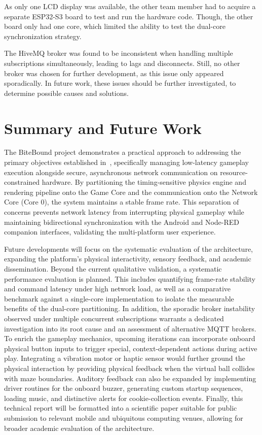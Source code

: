 \documentclass[10pt,journal,final,a4paper]{IEEEtran}
\begin{document}
As only one LCD display was available, the other team member had to acquire a separate ESP32-S3 board to test and run the hardware code. Though, the other board only had one core, which limited the ability to test the dual-core synchronization strategy.

The HiveMQ broker was found to be inconsistent when handling multiple subscriptions simultaneously, leading to lags and disconnects. Still, no other broker was chosen for further development, as this issue only appeared sporadically. In future work, these issues should be further investigated, to determine possible causes and solutions.

\section{Summary and Future Work}
\label{sec:summary-future-work}

The BiteBound project demonstrates a practical approach to addressing the primary objectives established in~, specifically managing low-latency gameplay execution alongside secure, asynchronous network communication on resource-constrained hardware.
By partitioning the timing-sensitive physics engine and rendering pipeline onto the Game Core and the communication onto the Network Core (Core 0), the system maintains a stable frame rate.
This separation of concerns prevents network latency from interrupting physical gameplay while maintaining bidirectional synchronization with the Android and Node-RED companion interfaces, validating the multi-platform user experience.

Future developments will focus on the systematic evaluation of the architecture, expanding the platform's physical interactivity, sensory feedback, and academic dissemination.
Beyond the current qualitative validation, a systematic performance evaluation is planned. This includes quantifying frame-rate stability and command latency under high network load, as well as a comparative benchmark against a single-core implementation to isolate the measurable benefits of the dual-core partitioning. In addition, the sporadic broker instability observed under multiple concurrent subscriptions warrants a dedicated investigation into its root cause and an assessment of alternative MQTT brokers.
To enrich the gameplay mechanics, upcoming iterations can incorporate onboard physical button inputs to trigger special, context-dependent actions during active play.
Integrating a vibration motor or haptic sensor would further ground the physical interaction by providing physical feedback when the virtual ball collides with maze boundaries.
Auditory feedback can also be expanded by implementing driver routines for the onboard buzzer, generating custom startup sequences, loading music, and distinctive alerts for cookie-collection events.
Finally, this technical report will be formatted into a scientific paper suitable for public submission to relevant mobile and ubiquitous computing venues, allowing for broader academic evaluation of the architecture.

\balance 


\end{document}
